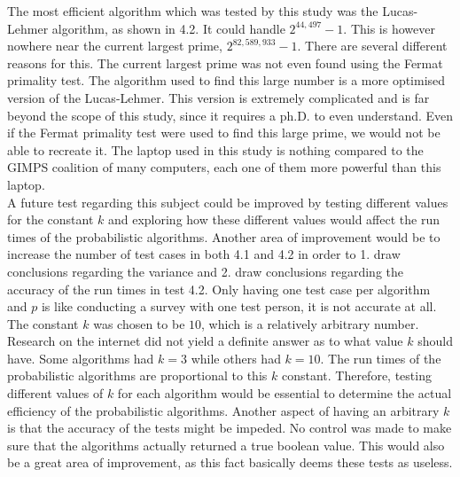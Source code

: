 \documentclass[main.tex]{subfiles}
\begin{document}
The most efficient algorithm which was tested by this study was the Lucas-Lehmer
algorithm, as shown in 4.2. It could handle $2^{44,497}-1$. This is however
nowhere near the current largest prime, $2^{82,589,933}-1$. There are several
different reasons for this. The current largest prime was not even found using
the Fermat primality test. The algorithm used to find this large number is a
more optimised version of the Lucas-Lehmer. This version is extremely
complicated and is far beyond the scope of this study, since it requires a ph.D.
to even understand. Even if the Fermat primality test were used to find this
large prime, we would not be able to recreate it. The laptop used in this study
is nothing compared to the GIMPS coalition of many computers, each
one of them more powerful than this laptop. \\

A future test regarding this subject could be improved by testing different
values for the constant $k$ and exploring how these different values would
affect the run times of the probabilistic algorithms. Another area of
improvement would be to increase the number of test cases in both 4.1 and 4.2 in
order to 1. draw conclusions regarding the variance and 2. draw conclusions
regarding the accuracy of the run times in test 4.2. Only having one test case
per algorithm and $p$ is like conducting a survey with one test person, it is
not accurate at all. \\

The constant $k$ was chosen to be $10$, which is a relatively arbitrary number.
Research on the internet did not yield a definite answer as to what value $k$
should have. Some algorithms had $k = 3$ while others had $k = 10$. The run
times of the probabilistic algorithms are proportional to this $k$ constant.
Therefore, testing different values of $k$ for each algorithm would be essential
to determine the actual efficiency of the probabilistic algorithms. Another
aspect of having an arbitrary $k$ is that the accuracy of the tests might be
impeded. No control was made to make sure that the algorithms actually returned
a true boolean value. This would also be a great area of improvement, as this
fact basically deems these tests as useless. \\
\end{document}
